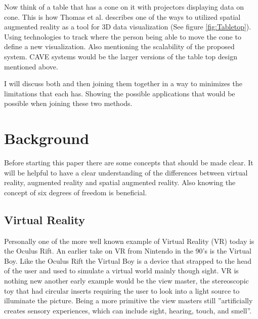 \documentclass{sig-alternate}
\begin{document}
Now think of a table that has a cone on it with projectors displaying data on cone. This is how Thomas et al. describes one of the ways to utilized spatial augmented reality as a tool for 3D data visualization (See figure \ref{fig:Tabletop}). Using technologies to track where the person being able to move the cone to define a new visualization. Also mentioning the scalability of the proposed system. CAVE systems would be the larger versions of the table top design mentioned above.      

I will discuss both and then joining them together in a way to minimizes the limitations that each has. Showing the possible applications that would be possible when joining these two methods.       


\section{Background}
\label{sec:background} 
Before starting this paper there are some concepts that should be made clear. It will be helpful to have a clear understanding of the differences between virtual reality, augmented reality and spatial augmented reality. Also knowing the concept of six degrees of freedom is beneficial.  

\subsection{Virtual Reality}
\label{sec:Virtual Reality}
Personally one of the more well known example of Virtual Reality (VR) today is the Oculus Rift. An earlier take on VR from Nintendo in the 90's is the Virtual Boy. Like the Oculus Rift the Virtual Boy is a device that strapped to the head of the user and used to simulate a virtual world mainly though sight. VR is nothing new another early example would be the view master, the stereoscopic toy that had circular inserts requiring the user to look into a light source to illuminate the picture. Being a more primitive the view masters still ''artificially creates sensory experiences, which can include sight, hearing, touch, and smell''\cite{VR}.       
\end{document}

